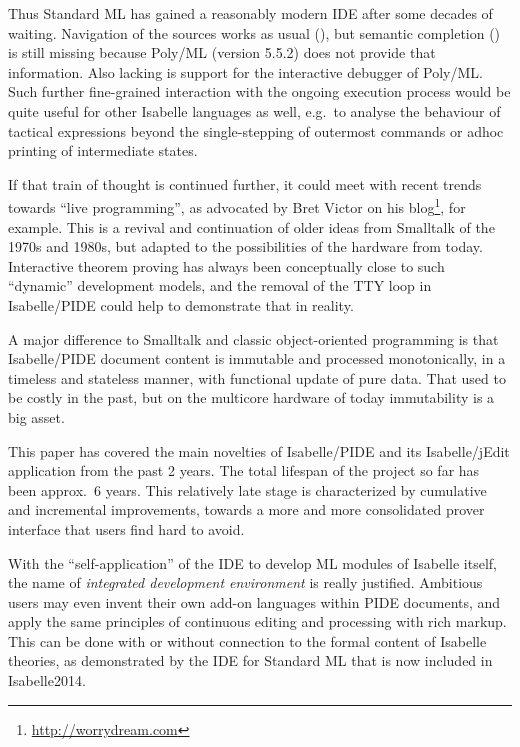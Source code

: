\begin{isabellebody}
\begin{isamarkuptext}
Thus Standard ML has gained a reasonably modern IDE after some decades of
waiting. Navigation of the sources works as usual (),
but semantic completion () is still missing because
Poly/ML (version 5.5.2) does not provide that information. Also lacking is
support for the interactive debugger of Poly/ML. Such further fine-grained
interaction with the ongoing execution process would be quite useful for
other Isabelle languages as well, e.g.\ to analyse the behaviour of tactical
expressions beyond the single-stepping of outermost commands or adhoc
printing of intermediate states.

\medskip If that train of thought is continued further, it could meet with
recent trends towards ``live programming'', as advocated by Bret Victor on
his blog\footnote{\url{http://worrydream.com}}, for example. This is a
revival and continuation of older ideas from Smalltalk of the 1970s and
1980s, but adapted to the possibilities of the hardware from today.
Interactive theorem proving has always been conceptually close to such
``dynamic'' development models, and the removal of the TTY loop in
Isabelle/PIDE could help to demonstrate that in reality.

A major difference to Smalltalk and classic object-oriented programming is
that Isabelle/PIDE document content is immutable and processed
monotonically, in a timeless and stateless manner, with functional update of
pure data. That used to be costly in the past, but on the multicore hardware
of today immutability is a big asset.\end{isamarkuptext}\isamarkuptrue {}
\isamarkuptrue \begin{isamarkuptext}This paper has covered the main novelties of Isabelle/PIDE and its
Isabelle/jEdit application from the past 2 years. The total lifespan of the
project so far has been approx.\ 6 years. This relatively late stage is
characterized by cumulative and incremental improvements, towards a more and
more consolidated prover interface that users find hard to avoid.

With the ``self-application'' of the IDE to develop ML modules of Isabelle
itself, the name of \emph{integrated development environment} is really
justified. Ambitious users may even invent their own add-on languages within
PIDE documents, and apply the same principles of continuous editing and
processing with rich markup. This can be done with or without connection to
the formal content of Isabelle theories, as demonstrated by the IDE for
Standard ML that is now included in Isabelle2014.


\end{isamarkuptext}
\end{isabellebody}
